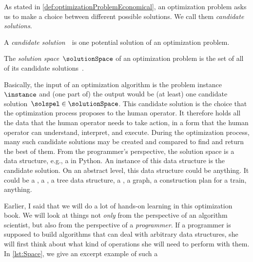 %
\label{sec:solutionSpace}%
%
%
\label{sec:solutionSpaceDefinitions}%
%
As stated in \autoref{def:optimizationProblemEconomical}, an optimization problem asks us to make a choice between different possible solutions.
We call them \emph{candidate solutions}.
%
\begin{definition}%
\label{def:candidateSolution}%
A \emph{candidate solution}~\solspel\ is one potential solution of an optimization problem.%
\end{definition}%
%
\begin{definition}%
\label{def:solutionSpace}%
The \emph{solution space}~$\solutionSpace$ of an optimization problem is the set of all of its candidate solutions~\solspel.%
\end{definition}%
%
Basically, the input of an optimization algorithm is the problem instance~$\instance$ and (one part of) the output would be (at least) one candidate solution~$\solspel\in\solutionSpace$.
This candidate solution is the choice that the optimization process proposes to the human operator.
It therefore holds all the data that the human operator needs to take action, in a form that the human operator can understand, interpret, and execute.
During the optimization process, many such candidate solutions may be created and compared to find and return the best of them.%
%
\endhsection%
%
%
%
From the programmer's perspective, the solution space is a data structure, e.g., a  in Python.
An instance of this data structure is the candidate solution.
On an abstract level, this data structure could be anything.
It could be a , a \numpyndarray, a tree data structure, a , a graph, a construction plan for a train, anything.

Earlier, I said that we will do a lot of hands-on learning in this optimization book.
We will look at things not \emph{only} from the perspective of an algorithm scientist, but also from the perspective of a \emph{programmer}.
If a programmer is supposed to build algorithms that can deal with arbitrary data structures, she will first think about what kind of operations she will need to perform with them.
In \autoref{lst:Space}, we give an excerpt example of such a 



